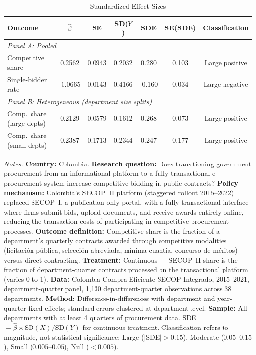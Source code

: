 \begin{table}
\begin{threeparttable}[t]
\centering
\caption{Standardized Effect Sizes}
\label{tab:sde}
\small
\begin{tabular}{lcccccc}
\toprule
Outcome & $\hat{\beta}$ & SE & SD($Y$) & SDE & SE(SDE) & Classification \\
\midrule
\multicolumn{7}{l}{\textit{Panel A: Pooled}} \\[3pt]
Competitive share & 0.2562 & 0.0943 & 0.2032 & 0.280 & 0.103 & Large positive \\
Single-bidder rate & -0.0665 & 0.0143 & 0.4166 & -0.160 & 0.034 & Large negative \\
\midrule
\multicolumn{7}{l}{\textit{Panel B: Heterogeneous (department size splits)}} \\[3pt]
Comp.\ share (large depts) & 0.2129 & 0.0579 & 0.1612 & 0.268 & 0.073 & Large positive \\
Comp.\ share (small depts) & 0.2387 & 0.1713 & 0.2344 & 0.247 & 0.177 & Large positive \\
\bottomrule
\end{tabular}
\begin{tablenotes}[flushleft]\small
\item \textit{Notes:} \textbf{Country:} Colombia. \textbf{Research question:} Does transitioning government procurement from an informational platform to a fully transactional e-procurement system increase competitive bidding in public contracts? \textbf{Policy mechanism:} Colombia's SECOP~II platform (staggered rollout 2015--2022) replaced SECOP~I, a publication-only portal, with a fully transactional interface where firms submit bids, upload documents, and receive awards entirely online, reducing the transaction costs of participating in competitive procurement processes. \textbf{Outcome definition:} Competitive share is the fraction of a department's quarterly contracts awarded through competitive modalities (licitaci\'{o}n p\'{u}blica, selecci\'{o}n abreviada, m\'{i}nima cuant\'{i}a, concurso de m\'{e}ritos) versus direct contracting. \textbf{Treatment:} Continuous --- SECOP~II share is the fraction of department-quarter contracts processed on the transactional platform (varies 0 to 1). \textbf{Data:} Colombia Compra Eficiente SECOP Integrado, 2015--2021, department-quarter panel, 1,130 department-quarter observations across 38 departments. \textbf{Method:} Difference-in-differences with department and year-quarter fixed effects; standard errors clustered at department level. \textbf{Sample:} All departments with at least 4 quarters of procurement data. SDE $= \hat{\beta} \times \text{SD}(X) / \text{SD}(Y)$ for continuous treatment. Classification refers to magnitude, not statistical significance: Large ($|$SDE$| > 0.15$), Moderate ($0.05$--$0.15$), Small ($0.005$--$0.05$), Null ($< 0.005$).
\end{tablenotes}
\end{threeparttable}
\end{table}
